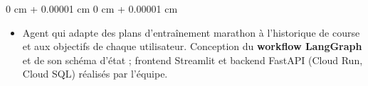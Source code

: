 \documentclass[10pt, letterpaper]{article}
\newenvironment{highlights}{
    \begin{itemize}[
        topsep=0.04 cm,
        parsep=0.02cm,
        partopsep=0pt,
        itemsep=0pt,
        leftmargin=0 cm + 10pt
    ]
}{
    \end{itemize}
} %
\newcommand{\stronglink}[2]{%
    \href{#1}{\textbf{\uline{\textcolor{blue}{#2}}}}%
}
\newenvironment{onecolentry}{
    \begin{adjustwidth}{
        0 cm + 0.00001 cm
    }{
        0 cm + 0.00001 cm
    }
}{
    \end{adjustwidth}
} %
\newenvironment{twocolentry}[2][]{
    \onecolentry
    \def\secondColumn{#2}
    \setcolumnwidth{\fill, 3.8 cm}
    \begin{paracol}{2}
}{
    \switchcolumn \raggedleft \secondColumn
    \end{paracol}
    \endonecolentry
} %
\begin{document}
        \vspace{0.10cm}

    \begin{onecolentry}
        \begin{highlights}
            \item Agent qui adapte des plans d'entraînement marathon à l'historique de course et aux objectifs de chaque utilisateur. Conception du \textbf{workflow LangGraph} et de son schéma d'état ; frontend Streamlit et backend FastAPI (Cloud Run, Cloud SQL) réalisés par l'équipe.
        \end{highlights}
    \end{onecolentry}

%
%
%
\end{document}
